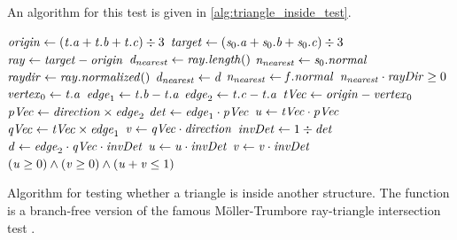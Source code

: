 An algorithm for this  test is given in \cref{alg:triangle_inside_test}.
%
\begin{algorithm}
	\centering
	\begin{algorithmic}[1]
			\State $\mathit{origin} \gets (\mathit{t}.\mathit{a} + \mathit{t}.\mathit{b} + \mathit{t}.\mathit{c}) \div 3$ 
			\State $\mathit{target} \gets (\mathit{s}_0.\mathit{a} + \mathit{s}_0.\mathit{b} + \mathit{s}_0.\mathit{c}) \div 3$ 
			\State $\mathit{ray} \gets \mathit{target} - \mathit{origin}$
			\State $\mathit{d}_{\mathit{nearest}} \gets \mathit{ray}.\mathit{length}()$
			\State $\mathit{n}_{\mathit{nearest}} \gets \mathit{s}_0.\mathit{normal}$
			\State $\mathit{raydir} \gets \mathit{ray}.\mathit{normalized}()$
			 
						\State $\mathit{d}_{\mathit{nearest}} \gets \mathit{d}$
						\State $\mathit{n}_{\mathit{nearest}} \gets \mathit{f}.\mathit{normal}$
					\EndIf
				\EndIf
			\EndFor
			\State \Return $\mathit{n}_{\mathit{nearest}} \cdot \mathit{rayDir} \geq 0$
		\EndFunction
		\\
			\State $\mathit{vertex}_0 \gets \mathit{t}.\mathit{a}$
			\State $\mathit{edge}_1 \gets \mathit{t}.\mathit{b} - \mathit{t}.\mathit{a}$
			\State $\mathit{edge}_2 \gets \mathit{t}.\mathit{c} - \mathit{t}.\mathit{a}$
			\State $\mathit{tVec} \gets \mathit{origin} - \mathit{vertex}_0$
			\State $\mathit{pVec} \gets \mathit{direction} \times \mathit{edge}_2$
			\State $\mathit{det} \gets \mathit{edge}_1 \cdot \mathit{pVec}$
			\State $\mathit{u} \gets \mathit{tVec} \cdot \mathit{pVec}$
			\State $\mathit{qVec} \gets \mathit{tVec} \times \mathit{edge}_1$
			\State $\mathit{v} \gets \mathit{qVec} \cdot \mathit{direction}$
			\State $\mathit{invDet} \gets 1 \div \mathit{det}$
			\State $\mathit{d} \gets \mathit{edge}_2 \cdot \mathit{qVec} \cdot \mathit{invDet}$
			\State $\mathit{u} \gets \mathit{u} \cdot \mathit{invDet}$
			\State $\mathit{v} \gets \mathit{v} \cdot \mathit{invDet}$
			\State \Return $(\mathit{u} \geq 0) \wedge (\mathit{v} \geq 0) \wedge (\mathit{u} + \mathit{v} \leq 1)$
		\EndFunction
	\end{algorithmic}
	\caption[Triangle inside structure test]{
		Algorithm for testing whether a triangle is inside another structure.
		The  function is a branch-free version of the famous Möller-Trumbore ray-triangle intersection test \cite{ray_triangle_intersection_moller}.
	}
	\label{alg:triangle_inside_test}
\end{algorithm}
